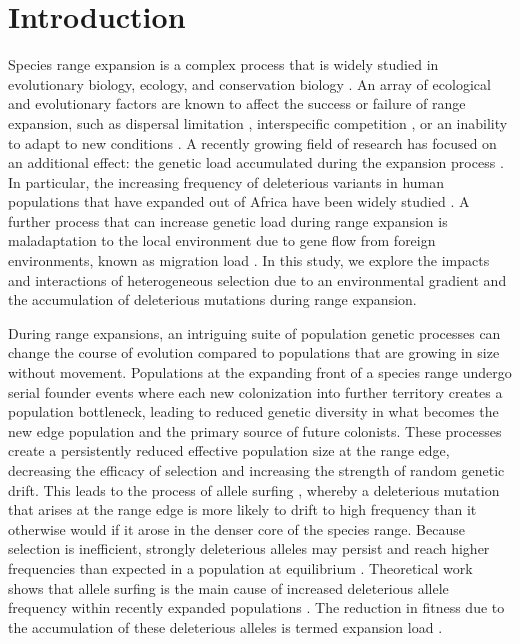\section{Introduction}
Species range expansion is a complex process that is widely studied in evolutionary biology, ecology, and conservation biology \citep{Chen:2011, Colautti:2013, Hastings:2005, Phillips:2006, Excoffier:2009, Hallatschek:2010}. An array of ecological and evolutionary factors are known to affect the success or failure of range expansion, such as dispersal limitation \citep{Hargreaves:2014b, Marsico:2009, Hastings:2005}, interspecific competition \citep{Case:2000, Price:2009,Svenning:2014, Louthan:2015}, or an inability to adapt to new conditions \citep{Polechova:2015, Holt:2011, Angert:2008}. A recently growing field of research has focused on an additional effect: the genetic load accumulated during the expansion process \citep{Excoffier:2009, Hallatschek:2010, Peischl:2013, Peischl:2015, Peischl:2015b}. In particular, the increasing frequency of deleterious variants in human populations that have expanded out of Africa have been widely studied \citep{Henn:2015, Do:2015, Lohmueller:2008}. A further process that can increase genetic load during range expansion is maladaptation to the local environment due to gene flow from foreign environments, known as migration load \citep{Kirkpatrick:1997, Barton:2001, Polechova:2015}. In this study, we explore the impacts and interactions of heterogeneous selection due to an environmental gradient and the accumulation of deleterious mutations during range expansion.

During range expansions, an intriguing suite of population genetic processes can change the course of evolution compared to populations that are growing in size without movement. Populations at the expanding front of a species range undergo serial founder events where each new colonization into further territory creates a population bottleneck, leading to reduced genetic diversity in what becomes the new edge population and the primary source of future colonists. These processes create a persistently reduced effective population size at the range edge, decreasing the efficacy of selection and increasing the strength of random genetic drift. This leads to the process of allele surfing \citep{Klopfstein:2006}, whereby a deleterious mutation that arises at the range edge is more likely to drift to high frequency than it otherwise would if it arose in the denser core of the species range. Because selection is inefficient, strongly deleterious alleles may persist and reach higher frequencies than expected in a population at equilibrium \citep{Peischl:2015}. Theoretical work shows that allele surfing is the main cause of increased deleterious allele frequency within recently expanded populations \citep{Excoffier:2009}. The reduction in fitness due to the accumulation of these deleterious alleles is termed expansion load \citep{Peischl:2013,Peischl:2015}.

